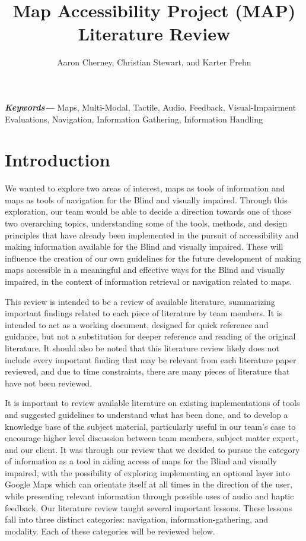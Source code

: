 \documentclass{article}
\title{Map Accessibility Project (MAP) Literature Review}
\author{Aaron Cherney, Christian Stewart, and Karter Prehn}
\providecommand{\keywords}[1]
{
  \small	
  \textbf{\textit{Keywords---}} #1
}
\begin{document}
\maketitle

\keywords{Maps, Multi-Modal, Tactile, Audio, Feedback, Visual-Impairment Evaluations, Navigation, Information Gathering, Information Handling}

\section{Introduction}

\par We wanted to explore two areas of interest, maps as tools of information and maps as tools of navigation for the Blind and visually impaired. Through this exploration, our team would be able to decide a direction towards one of those two overarching topics, understanding some of the tools, methods, and design principles that have already been implemented in the pursuit of accessibility and making information available for the Blind and visually impaired. These will influence the creation of our own guidelines for the future development of making maps accessible in a meaningful and effective ways for the Blind and visually impaired, in the context of information retrieval or navigation related to maps.
\newline
\par This review is intended to be a review of available literature, summarizing important findings related to each piece of literature by team members. It is intended to act as a working document, designed for quick reference and guidance, but not a substitution for deeper reference and reading of the original literature. It should also be noted that this literature review likely does not include every important finding that may be relevant from each literature paper reviewed, and due to time constraints, there are many pieces of literature that have not been reviewed. 
\newline
\par It is important to review available literature on existing implementations of tools and suggested guidelines to understand what has been done, and to develop a knowledge base of the subject material, particularly useful in our team’s case to encourage higher level discussion between team members, subject matter expert, and our client. It was through our review that we decided to pursue the category of information as a tool in aiding access of maps for the Blind and visually impaired, with the possibility of exploring implementing an optional layer into Google Maps which can orientate itself at all times in the direction of the user, while presenting relevant information through possible uses of audio and haptic feedback.  
\newline
Our literature review taught several important lessons. These lessons fall into three distinct categories: navigation, information-gathering, and modality. Each of these categories will be reviewed below. 
\end{document}
